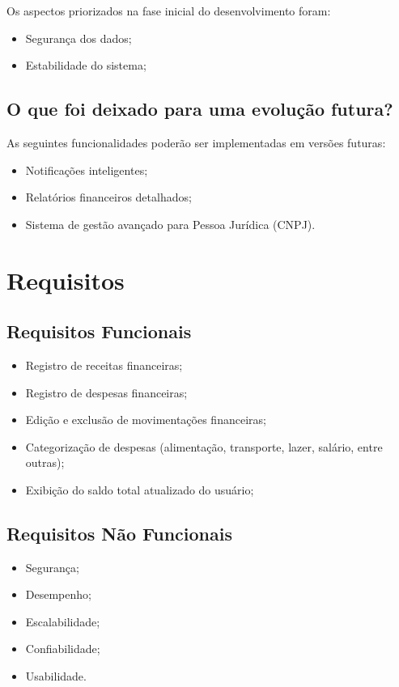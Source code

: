 \documentclass{article}
\begin{document}
Os aspectos priorizados na fase inicial do desenvolvimento foram:

\begin{itemize}
    \item Segurança dos dados;
    \item Estabilidade do sistema;
\end{itemize}

\subsection{O que foi deixado para uma evolução futura?}

As seguintes funcionalidades poderão ser implementadas em versões futuras:

\begin{itemize}
    \item Notificações inteligentes;
    \item Relatórios financeiros detalhados;
    \item Sistema de gestão avançado para Pessoa Jurídica (CNPJ).
\end{itemize}

\section{Requisitos}

\subsection{Requisitos Funcionais}

\begin{itemize}
    \item Registro de receitas financeiras;
    \item Registro de despesas financeiras;
    \item Edição e exclusão de movimentações financeiras;
    \item Categorização de despesas (alimentação, transporte, lazer, salário, entre outras);
    \item Exibição do saldo total atualizado do usuário;
\end{itemize}

\subsection{Requisitos Não Funcionais}

\begin{itemize}
    \item Segurança;
    \item Desempenho;
    \item Escalabilidade;
    \item Confiabilidade;
    \item Usabilidade.
\end{itemize}
\end{document}
